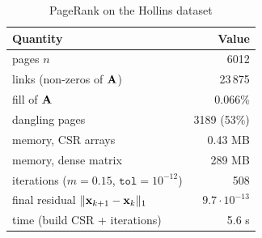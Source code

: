 \begin{table}[H]\centering
\begin{tabular}{lr}
\toprule
\textbf{Quantity} & \textbf{Value} \\
\midrule
pages $n$ & 6012 \\
links (non-zeros of $\mathbf{A}$) & 23\,875 \\
fill of $\mathbf{A}$ & 0.066\% \\
dangling pages & 3189 (53\%) \\
memory, CSR arrays & 0.43 MB \\
memory, dense matrix & 289 MB \\
iterations ($m=0.15$, $\texttt{tol}=10^{-12}$) & 508 \\
final residual $\|\mathbf{x}_{k+1}-\mathbf{x}_k\|_1$ & $9.7\cdot10^{-13}$ \\
time (build CSR + iterations) & 5.6 s \\
\bottomrule
\end{tabular}
\caption{PageRank on the Hollins dataset}
\label{tab:hollins}
\end{table}


